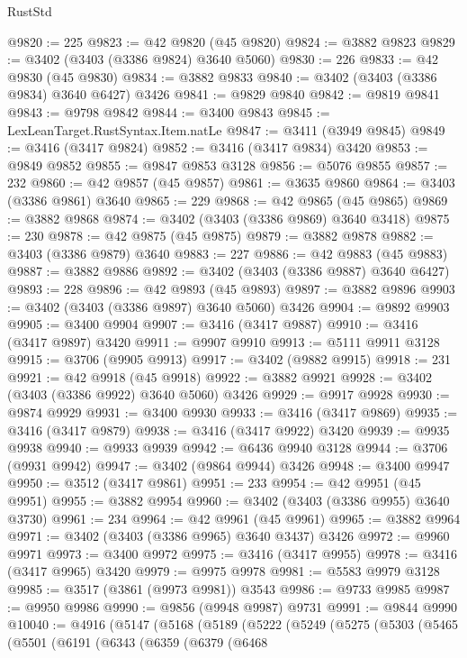 \begin{lexlean}{RustStd}
\begin{coremodule}
@9820 := 225
@9823 := @42 @9820 (@45 @9820)
@9824 := @3882 @9823
@9829 := @3402 (@3403 (@3386 @9824) @3640 @5060)
@9830 := 226
@9833 := @42 @9830 (@45 @9830)
@9834 := @3882 @9833
@9840 := @3402 (@3403 (@3386 @9834) @3640 @6427) @3426
@9841 := @9829 @9840
@9842 := @9819 @9841
@9843 := @9798 @9842
@9844 := @3400 @9843
@9845 := LexLeanTarget.RustSyntax.Item.natLe
@9847 := @3411 (@3949 @9845)
@9849 := @3416 (@3417 @9824)
@9852 := @3416 (@3417 @9834) @3420
@9853 := @9849 @9852
@9855 := @9847 @9853 @3128
@9856 := @5076 @9855
@9857 := 232
@9860 := @42 @9857 (@45 @9857)
@9861 := @3635 @9860
@9864 := @3403 (@3386 @9861) @3640
@9865 := 229
@9868 := @42 @9865 (@45 @9865)
@9869 := @3882 @9868
@9874 := @3402 (@3403 (@3386 @9869) @3640 @3418)
@9875 := 230
@9878 := @42 @9875 (@45 @9875)
@9879 := @3882 @9878
@9882 := @3403 (@3386 @9879) @3640
@9883 := 227
@9886 := @42 @9883 (@45 @9883)
@9887 := @3882 @9886
@9892 := @3402 (@3403 (@3386 @9887) @3640 @6427)
@9893 := 228
@9896 := @42 @9893 (@45 @9893)
@9897 := @3882 @9896
@9903 := @3402 (@3403 (@3386 @9897) @3640 @5060) @3426
@9904 := @9892 @9903
@9905 := @3400 @9904
@9907 := @3416 (@3417 @9887)
@9910 := @3416 (@3417 @9897) @3420
@9911 := @9907 @9910
@9913 := @5111 @9911 @3128
@9915 := @3706 (@9905 @9913)
@9917 := @3402 (@9882 @9915)
@9918 := 231
@9921 := @42 @9918 (@45 @9918)
@9922 := @3882 @9921
@9928 := @3402 (@3403 (@3386 @9922) @3640 @5060) @3426
@9929 := @9917 @9928
@9930 := @9874 @9929
@9931 := @3400 @9930
@9933 := @3416 (@3417 @9869)
@9935 := @3416 (@3417 @9879)
@9938 := @3416 (@3417 @9922) @3420
@9939 := @9935 @9938
@9940 := @9933 @9939
@9942 := @6436 @9940 @3128
@9944 := @3706 (@9931 @9942)
@9947 := @3402 (@9864 @9944) @3426
@9948 := @3400 @9947
@9950 := @3512 (@3417 @9861)
@9951 := 233
@9954 := @42 @9951 (@45 @9951)
@9955 := @3882 @9954
@9960 := @3402 (@3403 (@3386 @9955) @3640 @3730)
@9961 := 234
@9964 := @42 @9961 (@45 @9961)
@9965 := @3882 @9964
@9971 := @3402 (@3403 (@3386 @9965) @3640 @3437) @3426
@9972 := @9960 @9971
@9973 := @3400 @9972
@9975 := @3416 (@3417 @9955)
@9978 := @3416 (@3417 @9965) @3420
@9979 := @9975 @9978
@9981 := @5583 @9979 @3128
@9985 := @3517 (@3861 (@9973 @9981)) @3543
@9986 := @9733 @9985
@9987 := @9950 @9986
@9990 := @9856 (@9948 @9987) @9731
@9991 := @9844 @9990
@10040 := @4916
    (@5147
      (@5168
        (@5189
          (@5222
            (@5249
              (@5275
                (@5303
                  (@5465
                    (@5501
                      (@6191
                        (@6343
                          (@6359
                            (@6379
                              (@6468

\end{coremodule}
\end{lexlean}
